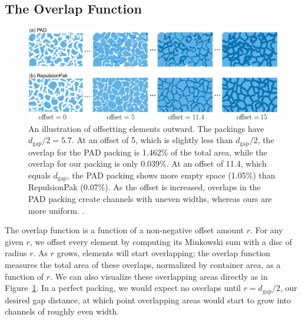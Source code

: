 \subsection{The Overlap Function}
\label{section_overlap_function}

\begin{figure}
\centering
\includegraphics[width=1.0\textwidth]{figures/metrics/overlap_metric.pdf}
\caption[An illustration of offsetting elements outward]
{\label{fig_overlap_function}
    An illustration of offsetting elements outward. The packings have $d_\mathrm{gap} / 2 = 5.7$.  
    At an offset of 5, which is slightly less than $d_\mathrm{gap} / 2$,
    the overlap for the PAD packing is 1.462\% of the total area, while the overlap for our packing is only 0.039\%.
    At an offset of 11.4, which equals $d_\mathrm{gap}$, the PAD packing shows more empty space (1.05\%) than RepulsionPak (0.07\%).
    As the offset is increased, overlaps in the PAD packing create channels
  with uneven widths, whereas ours are more uniform.
  .
  }
\end{figure}

The overlap function is a function of a non-negative offset amount
$r$.  For any given $r$, we offset every element by computing its Minkowski
sum with a disc of radius $r$.  As $r$ grows, elements will start overlapping;
the overlap function measures the total area of these overlaps, normalized
by container area, as a function of $r$.  We can also visualize these 
overlapping areas directly as in Figure~\ref{fig_overlap_function}.  In a 
perfect packing, we would expect no overlaps until $r=d_\mathrm{gap}/2$,
our desired gap distance, at which point overlapping areas would start to
grow into channels of roughly even width.



